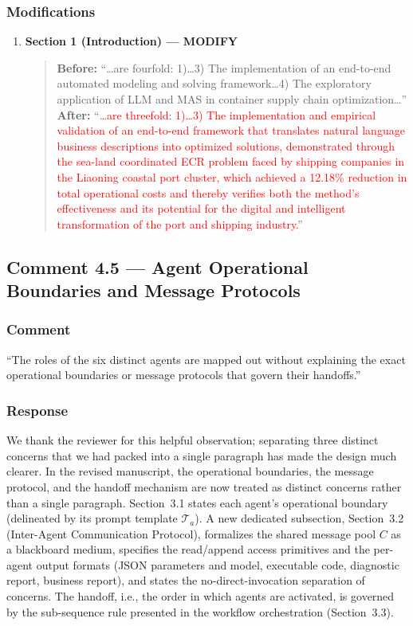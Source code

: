\documentclass[11pt,a4paper]{article}
\begin{document}
\subsubsection{Modifications}
\begin{enumerate}
\item \textbf{Section 1 (Introduction) --- MODIFY}
\begin{quote}
\textbf{Before:} ``\ldots are fourfold: 1)\ldots 3) The implementation of an end-to-end automated modeling and solving framework\ldots 4) The exploratory application of LLM and MAS in container supply chain optimization\ldots''\\[4pt]
\textbf{After:} ``\ldots \textcolor{red}{are threefold: 1)\ldots 3) The implementation and empirical validation of an end-to-end framework that translates natural language business descriptions into optimized solutions, demonstrated through the sea-land coordinated ECR problem faced by shipping companies in the Liaoning coastal port cluster, which achieved a 12.18\% reduction in total operational costs and thereby verifies both the method's effectiveness and its potential for the digital and intelligent transformation of the port and shipping industry.}''
\end{quote}
\end{enumerate}

\subsection{Comment 4.5 --- Agent Operational Boundaries and Message Protocols}

\subsubsection{Comment}
``The roles of the six distinct agents are mapped out without explaining the exact operational boundaries or message protocols that govern their handoffs.''

\subsubsection{Response}
We thank the reviewer for this helpful observation; separating three distinct concerns that we had packed into a single paragraph has made the design much clearer. In the revised manuscript, the operational boundaries, the message protocol, and the handoff mechanism are now treated as distinct concerns rather than a single paragraph. Section~3.1 states each agent's operational boundary (delineated by its prompt template $\mathcal{T}_a$). A new dedicated subsection, Section~3.2 (Inter-Agent Communication Protocol), formalizes the shared message pool $C$ as a blackboard medium, specifies the read/append access primitives and the per-agent output formats (JSON parameters and model, executable code, diagnostic report, business report), and states the no-direct-invocation separation of concerns. The handoff, i.e., the order in which agents are activated, is governed by the sub-sequence rule presented in the workflow orchestration (Section~3.3).
\end{document}
